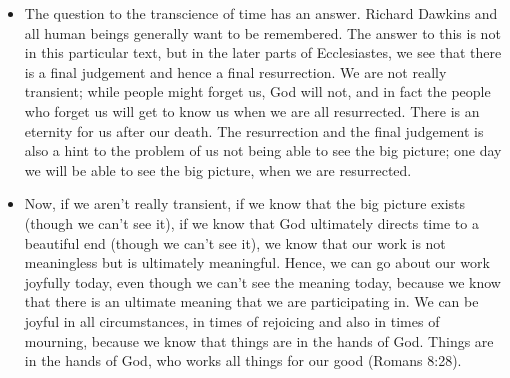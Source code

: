 \begin{itemize}
{\begin{itemize}
{    housewife who does nothing but housework daily, it might seem really
    tedious, but with God in her heart, because she knows God is working in
    every moment, she can enjoy every moment.  E.g one person might want to
    celebrate, but God has stricken him with a disease outside of his
    control.  What can he do?  With God with him, he can still celebrate, but
    in a different way; once he knows that all this is part of God's plan for
    His purposes, he can work with God's plan joyfully to proclaim God's
    glory even in his sickness.  These are some of the hints that the author
    of Ecclesiastes has dropped for us to answer the tyranny of time.}
    \item{The question to the transcience of time has an answer.  Richard
    Dawkins and all human beings generally want to be remembered.  The answer
    to this is not in this particular text, but in the later parts of
    Ecclesiastes, we see that there is a final judgement and hence a final
    resurrection.  We are not really transient; while people might forget us,
    God will not, and in fact the people who forget us will get to know us
    when we are all resurrected.  There is an eternity for us after our
    death.  The resurrection and the final judgement is also a hint to the
    problem of us not being able to see the big picture; one day we will be
    able to see the big picture, when we are resurrected.  }
    \item{Now, if we aren't really transient, if we know that the big picture
    exists (though we can't see it), if we know that God ultimately directs
    time to a beautiful end (though we can't see it), we know that our work
    is not meaningless but is ultimately meaningful.  Hence, we can go about
    our work joyfully today, even though we can't see the meaning today,
    because we know that there is an ultimate meaning that we are
    participating in.  We can be joyful in all circumstances, in times of
    rejoicing and also in times of mourning, because we know that things are
    in the hands of God.  Things are in the hands of God, who works all
    things for our good (Romans 8:28). }
  \end{itemize}}
\end{itemize}